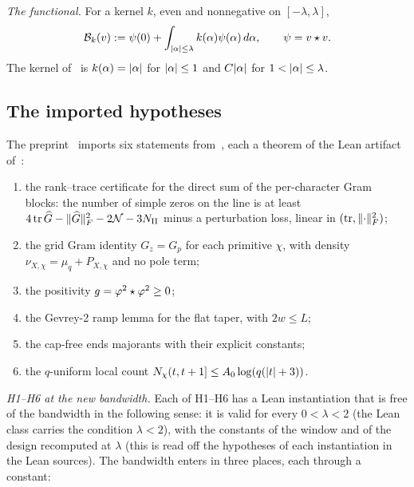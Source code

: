 \emph{The functional.} For a kernel $k$, even and nonnegative on $[-\lambda,\lambda]$,
\begin{equation}\label{eq:B}
\mathcal B_k(v):=\psi(0)+\int_{\lvert \alpha\rvert\le\lambda}k(\alpha)\psi(\alpha)\,d\alpha,\qquad\psi=v\star v .
\end{equation}
The kernel of~\cite{DSouza} is $k(\alpha)=\lvert \alpha\rvert$ for $\lvert \alpha\rvert\le1$ and $C\lvert \alpha\rvert$ for $1<\lvert \alpha\rvert\le\lambda$.

\subsection{The imported hypotheses}\label{ssec:H}
The preprint~\cite{DSouza} imports six statements from~\cite{AF}, each a theorem of the Lean artifact of~\cite{AF}:
\begin{enumerate}[label=(H\arabic*)]
\item the rank--trace certificate for the direct sum of the per-character Gram blocks: the number of simple zeros on the line
is at least $4\operatorname{tr}\widehat G-\lVert \widehat G\rVert_F^2-2\mathcal N-3N_{\rm II}$ minus a perturbation loss, linear in $(\operatorname{tr},\lVert \cdot\rVert_F^2)$;
\item the grid Gram identity $G_z=G_p$ for each primitive $\chi$, with density $\nu_{X,\chi}=\mu_q+P_{X,\chi}$ and no pole term;
\item the positivity $g=\varphi^2\star\varphi^2\ge0$;
\item the Gevrey-2 ramp lemma for the flat taper, with $2w\le L$;
\item the cap-free ends majorants with their explicit constants;
\item the $q$-uniform local count $N_\chi(t,t+1]\le A_0\log(q(\lvert t\rvert+3))$.
\end{enumerate}
\emph{H1--H6 at the new bandwidth.} Each of H1--H6 has a Lean instantiation that is free of the bandwidth in the following sense: it is valid for
every $0<\lambda<2$ (the Lean class carries the condition $\lambda<2$), with the constants of the window and of the design recomputed at $\lambda$ (this is read off the
hypotheses of each instantiation in the Lean sources). The bandwidth enters in three
places, each through a constant:
